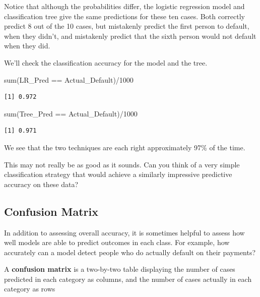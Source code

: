 \documentclass[
  letterpaper,
  DIV=11,
  numbers=noendperiod]{scrreprt}
\newenvironment{Shaded}{\begin{snugshade}}{\end{snugshade}}
\newcommand{\DecValTok}[1]{\textcolor[rgb]{0.68,0.00,0.00}{#1}}
\newcommand{\FunctionTok}[1]{\textcolor[rgb]{0.28,0.35,0.67}{#1}}
\newcommand{\NormalTok}[1]{\textcolor[rgb]{0.00,0.23,0.31}{#1}}
\newcommand{\SpecialCharTok}[1]{\textcolor[rgb]{0.37,0.37,0.37}{#1}}
\begin{document}
Notice that although the probabilities differ, the logistic regression
model and classification tree give the same predictions for these ten
cases. Both correctly predict 8 out of the 10 cases, but mistakenly
predict the first person to default, when they didn't, and mistakenly
predict that the sixth person would not default when they did.

We'll check the classification accuracy for the model and the tree.

\begin{Shaded}
\begin{Highlighting}[]
\FunctionTok{sum}\NormalTok{(LR\_Pred }\SpecialCharTok{==}\NormalTok{ Actual\_Default)}\SpecialCharTok{/}\DecValTok{1000}
\end{Highlighting}
\end{Shaded}

\begin{verbatim}
[1] 0.972
\end{verbatim}

\begin{Shaded}
\begin{Highlighting}[]
\FunctionTok{sum}\NormalTok{(Tree\_Pred }\SpecialCharTok{==}\NormalTok{ Actual\_Default)}\SpecialCharTok{/}\DecValTok{1000}
\end{Highlighting}
\end{Shaded}

\begin{verbatim}
[1] 0.971
\end{verbatim}

We see that the two techniques are each right approximately 97\% of the
time.

This may not really be as good as it sounds. Can you think of a very
simple classification strategy that would achieve a similarly impressive
predictive accuracy on these data?

\subsection{Confusion Matrix}\label{confusion-matrix}

In addition to assessing overall accuracy, it is sometimes helpful to
assess how well models are able to predict outcomes in each class. For
example, how accurately can a model detect people who do actually
default on their payments?

A \textbf{confusion matrix} is a two-by-two table displaying the number
of cases predicted in each category as columns, and the number of cases
actually in each category as rows
\end{document}
